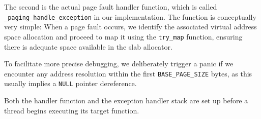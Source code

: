 The second is the actual page fault handler function, which is called \texttt{\_paging\_handle\_exception} in our implementation. The function is conceptually very simple:
When a page fault occurs, we identify the associated virtual address space allocation and proceed to map it using the \texttt{try\_map} function, ensuring there is adequate space available in the slab allocator.

To facilitate more precise debugging, we deliberately trigger a panic if we encounter any address resolution within the first \texttt{BASE\_PAGE\_SIZE} bytes, as this usually implies a \texttt{NULL} pointer dereference.

Both the handler function and the exception handler stack are set up before a thread begins executing its target function.

